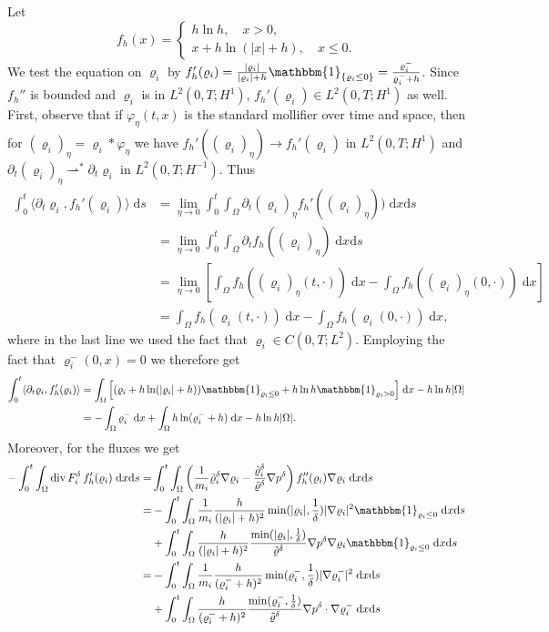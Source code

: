 \documentclass[11pt]{article}
\newcommand{\dd}{\mathrm{d}}
\newcommand{\ddiv}{\mathrm{div\,}}
\numberwithin{equation}{section}
\numberwithin{tw}{section}
\begin{document}
Let 
\[ f_h(x)=\left\{\begin{aligned}
    h\ln h, \quad x>0, \\
    x+h\ln(|x|+h), \quad x\leq 0.
\end{aligned}\right.\]
We test the equation on $\varrho_i$ by $f_h'(\varrho_i)=\frac{|\varrho_i|}{|\varrho_i|+h}\mathbbm{1}_{\{\varrho_i\leq 0\}}=\frac{\varrho_i^-}{\varrho_i^-+h}$. Since $f_h''$ is bounded and $\varrho_i$ is in $L^2(0,T;H^1)$, $f_h'(\varrho_i)\in L^2(0,T;H^1)$ as well. First, observe that if $\varphi_\eta(t,x)$ is the standard mollifier over time and space, then for $(\varrho_i)_\eta=\varrho_i\ast\varphi_\eta$ we have $f_h'((\varrho_i)_\eta)\to f_h'(\varrho_i)$ in $L^2(0,T;H^1)$ and $\partial_t(\varrho_i)_\eta\rightharpoonup^*\partial_t\varrho_i$ in $L^2(0,T;H^{-1})$. Thus
\[\begin{aligned} \int_0^t \langle\partial_t\varrho_i, f_h'(\varrho_i)\rangle \;\dd s &= \lim_{\eta\to 0}\int_0^t\int_\Omega \partial_t(\varrho_i)_\eta f_h'((\varrho_i)_\eta))\;\dd x\dd s \\
&= \lim_{\eta\to 0}\int_0^t\int_\Omega \partial_t f_h((\varrho_i)_\eta)\;\dd x\dd s \\
&= \lim_{\eta\to 0}\left[\int_\Omega f_h((\varrho_i)_\eta(t,\cdot))\;\dd x - \int_\Omega f_h((\varrho_i)_\eta(0,\cdot))\;\dd x\right] \\
&= \int_\Omega f_h(\varrho_i(t,\cdot))\;\dd x - \int_\Omega f_h(\varrho_i(0,\cdot))\;\dd x,
\end{aligned}\]
where in the last line we used the fact that $\varrho_i\in C(0,T;L^2)$. Employing the fact that $\varrho_i^-(0,x)=0$ we therefore get
\[\begin{aligned} \int_0^t\langle \partial_t\varrho_i, f_h'(\varrho_i)\rangle &= \int_\Omega \Big[(\varrho_i+h\ln(|\varrho_i|+h))\mathbbm{1}_{\varrho_i\leq 0} + h\ln h\mathbbm{1}_{\varrho_i>0}\Big] \;\dd x - h\ln h |\Omega| \\
&= -\int_\Omega \varrho_i^- \;\dd x + \int_\Omega h\ln(\varrho_i^-+h)\;\dd x - h\ln h|\Omega|.
\end{aligned}\]
Moreover, for the fluxes we get
\[\begin{aligned}
    -\int_0^t\int_\Omega \ddiv F_i^\delta\,f_h'(\varrho_i)\;\dd x\dd s =& \int_0^t\int_\Omega \left(\frac{1}{m_i}\tilde\varrho_i^\delta\nabla\varrho_i-\frac{\tilde\varrho_i^\delta}{\tilde\varrho^\delta}\nabla p^\delta\right)f_h''(\varrho_i)\nabla\varrho_i \;\dd x\dd s \\
    =& -\int_0^t\int_\Omega \frac{1}{m_i}\frac{h}{(|\varrho_i|+h)^2}\min(|\varrho_i|,\frac{1}{\delta})|\nabla\varrho_i|^2\mathbbm{1}_{\varrho_i\leq 0} \;\dd x\dd s \\
    &+ \int_0^t\int_\Omega \frac{h}{(|\varrho_i|+h)^2}\frac{\min(|\varrho_i|,\frac{1}{\delta})}{\tilde\varrho^\delta}\nabla p^\delta\nabla\varrho_i\mathbbm{1}_{\varrho_i\leq 0} \;\dd x\dd s \\
    =& -\int_0^t\int_\Omega \frac{1}{m_i}\frac{h}{(\varrho_i^-+h)^2}\min(\varrho_i^-,\frac{1}{\delta})|\nabla\varrho_i^-|^2\;\dd x\dd s \\
    &+ \int_0^t\int_\Omega \frac{h}{(\varrho_i^-+h)^2}\frac{\min(\varrho_i^-,\frac{1}{\delta})}{\tilde\varrho^\delta}\nabla p^\delta\cdot\nabla\varrho_i^-\;\dd x\dd s
\end{aligned}\]
\end{document}
